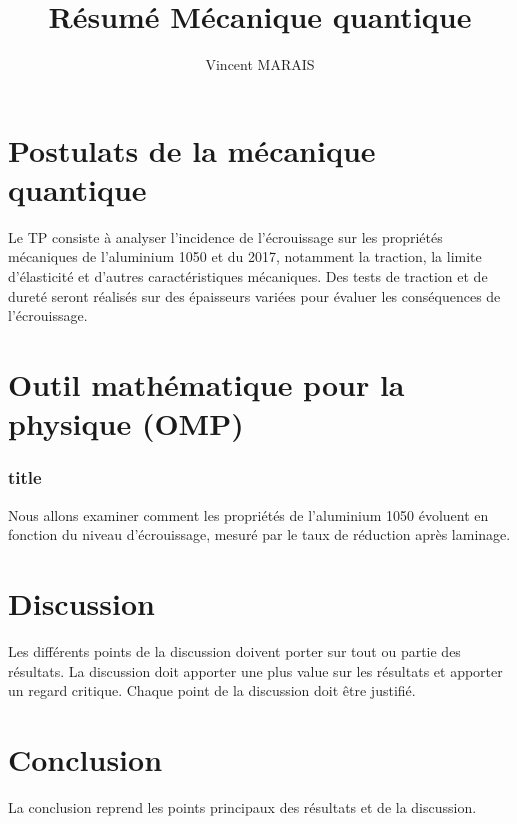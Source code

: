 \documentclass[12pt,a4paper]{article}
\title{Résumé Mécanique quantique}
\author{\textup{Vincent MARAIS}}
\begin{document}
	
	
	\tableofcontents
\section{Postulats de la mécanique quantique}
	
Le TP consiste à analyser l'incidence de l'écrouissage sur les propriétés mécaniques de l'aluminium 1050 et du 2017, notamment la traction, la limite d'élasticité et d'autres caractéristiques mécaniques. Des tests de traction et de dureté seront réalisés sur des épaisseurs variées pour évaluer les conséquences de l'écrouissage.
	


\section{Outil mathématique pour la physique (OMP)}

\subsubsection{title}
Nous allons examiner comment les propriétés de l'aluminium 1050 évoluent en fonction du niveau d'écrouissage, mesuré par le taux de réduction après laminage.

\vspace{0.2cm}




\section{Discussion}	
Les différents points de la discussion doivent porter sur tout ou partie des résultats. La discussion doit apporter une plus value sur les résultats et apporter un regard critique. Chaque point de la discussion doit être justifié.
	
\section{Conclusion}	
La conclusion reprend les points principaux des résultats et de la discussion.
	
\end{document}
